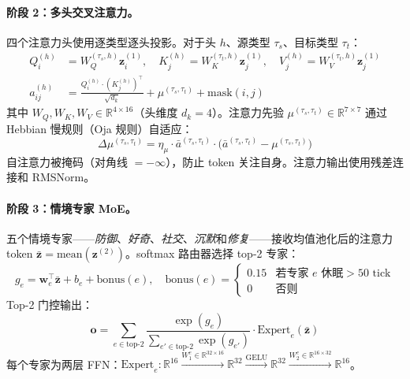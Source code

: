 \documentclass[11pt]{article}
\begin{document}
\paragraph{阶段 2：多头交叉注意力。}
四个注意力头使用逐类型逐头投影。对于头 $h$、源类型 $\tau_s$、目标类型 $\tau_t$：
\begin{align}
Q_i^{(h)} &= W_Q^{(\tau_s, h)} \mathbf{z}_i^{(1)}, \quad K_j^{(h)} = W_K^{(\tau_t, h)} \mathbf{z}_j^{(1)}, \quad V_j^{(h)} = W_V^{(\tau_t, h)} \mathbf{z}_j^{(1)} \\
a_{ij}^{(h)} &= \frac{Q_i^{(h)} \cdot (K_j^{(h)})^\top}{\sqrt{d_k}} + \mu^{(\tau_s, \tau_t)} + \text{mask}(i,j)
\end{align}
其中 $W_Q, W_K, W_V \in \mathbb{R}^{4 \times 16}$（头维度 $d_k = 4$）。注意力先验 $\mu^{(\tau_s, \tau_t)} \in \mathbb{R}^{7 \times 7}$ 通过 Hebbian 慢规则（Oja 规则）自适应：
\begin{equation}
\Delta\mu^{(\tau_s, \tau_t)} = \eta_\mu \cdot \bar{a}^{(\tau_s, \tau_t)} \cdot \bigl(\bar{a}^{(\tau_s, \tau_t)} - \mu^{(\tau_s, \tau_t)}\bigr)
\end{equation}
自注意力被掩码（对角线 $= -\infty$），防止 token 关注自身。注意力输出使用残差连接和 RMSNorm。

\paragraph{阶段 3：情境专家 MoE。}
五个情境专家——\emph{防御}、\emph{好奇}、\emph{社交}、\emph{沉默}和\emph{修复}——接收均值池化后的注意力 token $\bar{\mathbf{z}} = \text{mean}(\mathbf{z}^{(2)})$。softmax 路由器选择 top-2 专家：
\begin{equation}
\label{eq:moe-gate}
g_e = \mathbf{w}_e^\top \bar{\mathbf{z}} + b_e + \text{bonus}(e), \quad \text{bonus}(e) = \begin{cases} 0.15 & \text{若专家 } e \text{ 休眠} > 50 \text{ tick} \\ 0 & \text{否则} \end{cases}
\end{equation}
Top-2 门控输出：
\begin{equation}
\mathbf{o} = \sum_{e \in \text{top-2}} \frac{\exp(g_e)}{\sum_{e' \in \text{top-2}} \exp(g_{e'})} \cdot \text{Expert}_e(\bar{\mathbf{z}})
\end{equation}
每个专家为两层 FFN：$\text{Expert}_e: \mathbb{R}^{16} \xrightarrow{W_1^e \in \mathbb{R}^{32 \times 16}} \mathbb{R}^{32} \xrightarrow{\text{GELU}} \mathbb{R}^{32} \xrightarrow{W_2^e \in \mathbb{R}^{16 \times 32}} \mathbb{R}^{16}$。
\end{document}
